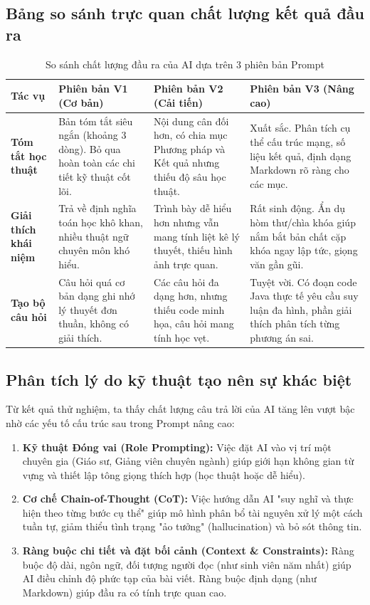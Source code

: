 \documentclass[12pt,a4paper]{article}
\begin{document}
\subsection{Bảng so sánh trực quan chất lượng kết quả đầu ra}
\begin{table}[H]
    \centering
    \caption{So sánh chất lượng đầu ra của AI dựa trên 3 phiên bản Prompt}
    \vspace{0.2cm}
    \small
    \begin{tabular}{|p{1.8cm}|p{4.2cm}|p{4.2cm}|p{5.4cm}|}
        \hline
        \textbf{Tác vụ} & \textbf{Phiên bản V1 (Cơ bản)} & \textbf{Phiên bản V2 (Cải tiến)} & \textbf{Phiên bản V3 (Nâng cao)} \\
        \hline
        \textbf{Tóm tắt học thuật} & Bản tóm tắt siêu ngắn (khoảng 3 dòng). Bỏ qua hoàn toàn các chi tiết kỹ thuật cốt lõi. & Nội dung cân đối hơn, có chia mục Phương pháp và Kết quả nhưng thiếu độ sâu học thuật. & Xuất sắc. Phân tích cụ thể cấu trúc mạng, số liệu kết quả, định dạng Markdown rõ ràng cho các mục. \\
        \hline
        \textbf{Giải thích khái niệm} & Trả về định nghĩa toán học khô khan, nhiều thuật ngữ chuyên môn khó hiểu. & Trình bày dễ hiểu hơn nhưng vẫn mang tính liệt kê lý thuyết, thiếu hình ảnh trực quan. & Rất sinh động. Ẩn dụ hòm thư/chìa khóa giúp nắm bắt bản chất cặp khóa ngay lập tức, giọng văn gần gũi. \\
        \hline
        \textbf{Tạo bộ câu hỏi} & Câu hỏi quá cơ bản dạng ghi nhớ lý thuyết đơn thuần, không có giải thích. & Các câu hỏi đa dạng hơn, nhưng thiếu code minh họa, câu hỏi mang tính học vẹt. & Tuyệt vời. Có đoạn code Java thực tế yêu cầu suy luận đa hình, phần giải thích phân tích từng phương án sai. \\
        \hline
    \end{tabular}
    \label{tab:prompt_comparison}
\end{table}

\subsection{Phân tích lý do kỹ thuật tạo nên sự khác biệt}
Từ kết quả thử nghiệm, ta thấy chất lượng câu trả lời của AI tăng lên vượt bậc nhờ các yếu tố cấu trúc sau trong Prompt nâng cao:
\begin{enumerate}
    \item \textbf{Kỹ thuật Đóng vai (Role Prompting):} Việc đặt AI vào vị trí một chuyên gia (Giáo sư, Giảng viên chuyên ngành) giúp giới hạn không gian từ vựng và thiết lập tông giọng thích hợp (học thuật hoặc dễ hiểu).
    \item \textbf{Cơ chế Chain-of-Thought (CoT):} Việc hướng dẫn AI "suy nghĩ và thực hiện theo từng bước cụ thể" giúp mô hình phân bổ tài nguyên xử lý một cách tuần tự, giảm thiểu tình trạng "ảo tưởng" (hallucination) và bỏ sót thông tin.
    \item \textbf{Ràng buộc chi tiết và đặt bối cảnh (Context \& Constraints):} Ràng buộc độ dài, ngôn ngữ, đối tượng người đọc (như sinh viên năm nhất) giúp AI điều chỉnh độ phức tạp của bài viết. Ràng buộc định dạng (như Markdown) giúp đầu ra có tính trực quan cao.
\end{enumerate}
\end{document}
